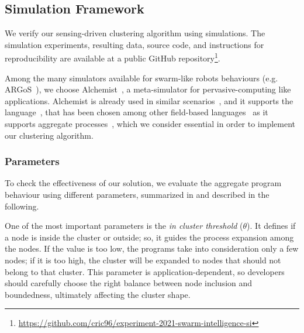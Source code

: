 \subsection{Simulation Framework}\label{s:eval:sim-framework}

We verify our sensing-driven clustering algorithm using simulations.
The simulation experiments, resulting data, source code, and instructions for reproducibility are available at a public GitHub repository\footnote{\url{https://github.com/cric96/experiment-2021-swarm-intelligence-si}}.

Among the many simulators available for swarm-like robots behaviours (e.g. ARGoS~\cite{Pinciroli:SI2012}),
 we choose Alchemist~\cite{DBLP:journals/jos/PianiniMV13}, a meta-simulator for pervasive-computing like applications.
%
Alchemist is already used in similar scenarios~\cite{DBLP:journals/eaai/CasadeiVAPD21}, and it supports the \scafi{} language~\cite{DBLP:conf/isola/CasadeiVAD20},
 that has been chosen among other field-based languages~\cite{DBLP:journals/jlap/ViroliBDACP19} as it supports aggregate processes~\cite{DBLP:conf/coordination/CasadeiVAPD19},
 which we consider essential in order to implement our clustering algorithm.


\subsubsection{Parameters}

To check the effectiveness of our solution, we evaluate the aggregate program behaviour
 using different parameters, summarized in  and described in the following.

One of the most important parameters is the \emph{in cluster threshold} ($\theta$).
 It defines if a node is inside the cluster or outside;
 so, it guides the  process expansion among the nodes.
 If the value is too low, the programs take into consideration only a few nodes;
 if it is too high, the cluster will be expanded to nodes that should not belong to that cluster.
 This parameter is application-dependent, so developers should carefully choose the right
 balance between node inclusion and boundedness, ultimately affecting the cluster shape.

